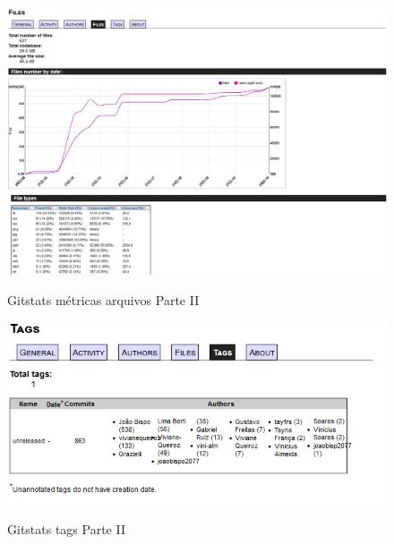 \begin{figure}[htb]
	\centering
	\caption{\label{fig_arq_virado}Gitstats métricas arquivos Parte II}
	\includegraphics[width=1.00\textwidth]{anexos/metricas4PartII.png}
	\label{metricas4PartII}
\end{figure}

\begin{figure}[htb]
	\centering
	\caption{\label{fig_arq_virado}Gitstats tags Parte II }
	\includegraphics[width=1.00\textwidth]{anexos/metricas5PartII.png}
	\label{metricas5PartII}
\end{figure}